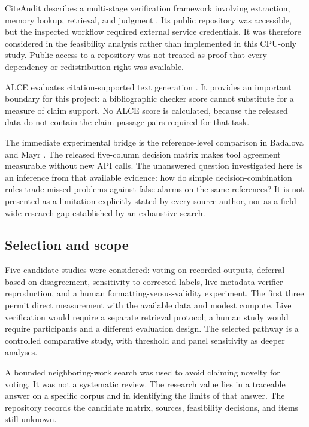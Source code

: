 \documentclass[acmsmall,screen,nonacm]{acmart}
\begin{document}
CiteAudit describes a multi-stage verification framework involving extraction, memory lookup, retrieval, and judgment \citep{shi2026}. Its public repository was accessible, but the inspected workflow required external service credentials. It was therefore considered in the feasibility analysis rather than implemented in this CPU-only study. Public access to a repository was not treated as proof that every dependency or redistribution right was available.

ALCE evaluates citation-supported text generation \citep{gao2023}. It provides an important boundary for this project: a bibliographic checker score cannot substitute for a measure of claim support. No ALCE score is calculated, because the released data do not contain the claim-passage pairs required for that task.

The immediate experimental bridge is the reference-level comparison in Badalova and Mayr \citep{badalova2026}. The released five-column decision matrix makes tool agreement measurable without new API calls. The unanswered question investigated here is an inference from that available evidence: how do simple decision-combination rules trade missed problems against false alarms on the same references? It is not presented as a limitation explicitly stated by every source author, nor as a field-wide research gap established by an exhaustive search.

\subsection{Selection and scope}
Five candidate studies were considered: voting on recorded outputs, deferral based on disagreement, sensitivity to corrected labels, live metadata-verifier reproduction, and a human formatting-versus-validity experiment. The first three permit direct measurement with the available data and modest compute. Live verification would require a separate retrieval protocol; a human study would require participants and a different evaluation design. The selected pathway is a controlled comparative study, with threshold and panel sensitivity as deeper analyses.

A bounded neighboring-work search was used to avoid claiming novelty for voting. It was not a systematic review. The research value lies in a traceable answer on a specific corpus and in identifying the limits of that answer. The repository records the candidate matrix, sources, feasibility decisions, and items still unknown.
\end{document}
